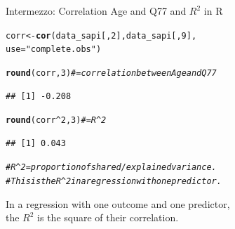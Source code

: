 \documentclass[10pt]{beamer}\usepackage[]{graphicx}\usepackage[]{xcolor}
\makeatletter
\newcommand{\hlnum}[1]{\textcolor[rgb]{0.686,0.059,0.569}{#1}}%
\newcommand{\hlstr}[1]{\textcolor[rgb]{0.192,0.494,0.8}{#1}}%
\newcommand{\hlcom}[1]{\textcolor[rgb]{0.678,0.584,0.686}{\textit{#1}}}%
\newcommand{\hlopt}[1]{\textcolor[rgb]{0,0,0}{#1}}%
\newcommand{\hlstd}[1]{\textcolor[rgb]{0.345,0.345,0.345}{#1}}%
\newcommand{\hlkwb}[1]{\textcolor[rgb]{0.69,0.353,0.396}{#1}}%
\newcommand{\hlkwc}[1]{\textcolor[rgb]{0.333,0.667,0.333}{#1}}%
\newcommand{\hlkwd}[1]{\textcolor[rgb]{0.737,0.353,0.396}{\textbf{#1}}}%
\newenvironment{kframe}{%
 \def\at@end@of@kframe{}%
 \ifinner\ifhmode%
  \def\at@end@of@kframe{\end{minipage}}%
  \begin{minipage}{\columnwidth}%
 \fi\fi%
 \def\FrameCommand##1{\hskip\@totalleftmargin \hskip-\fboxsep
 \colorbox{shadecolor}{##1}\hskip-\fboxsep
     \hskip-\linewidth \hskip-\@totalleftmargin \hskip\columnwidth}%
 \MakeFramed {\advance\hsize-\width
   \@totalleftmargin\z@ \linewidth\hsize
   \@setminipage}}%
 {\par\unskip\endMakeFramed%
 \at@end@of@kframe}
\newenvironment{knitrout}{}{} %
\makeatother
\begin{document}
%
\begin{frame}[fragile]{Intermezzo: Correlation Age and Q77 and $R^2$ in R}
\begin{knitrout}
\color{fgcolor}\begin{kframe}
\begin{alltt}
\hlstd{corr} \hlkwb{<-} \hlkwd{cor}\hlstd{(data_sapi[,} \hlnum{2}\hlstd{], data_sapi[,} \hlnum{9}\hlstd{],}
          \hlkwc{use} \hlstd{=} \hlstr{"complete.obs"}\hlstd{)}

\hlkwd{round}\hlstd{(corr,} \hlnum{3}\hlstd{)}   \hlcom{# = correlation between Age and Q77}
\end{alltt}
\begin{verbatim}
## [1] -0.208
\end{verbatim}
\end{kframe}
\end{knitrout}

\begin{knitrout}
\color{fgcolor}\begin{kframe}
\begin{alltt}
\hlkwd{round}\hlstd{(corr}\hlopt{^}\hlnum{2}\hlstd{,} \hlnum{3}\hlstd{)} \hlcom{# = R^2}
\end{alltt}
\begin{verbatim}
## [1] 0.043
\end{verbatim}
\begin{alltt}
\hlcom{# R^2 = proportion of shared/explained variance. }
\hlcom{# This is the R^2 in a regression with one predictor.}
\end{alltt}
\end{kframe}
\end{knitrout}
In a regression with one outcome and one predictor,\\
the $R^2$ is the square of their correlation.
\end{frame}
%
\end{document}
